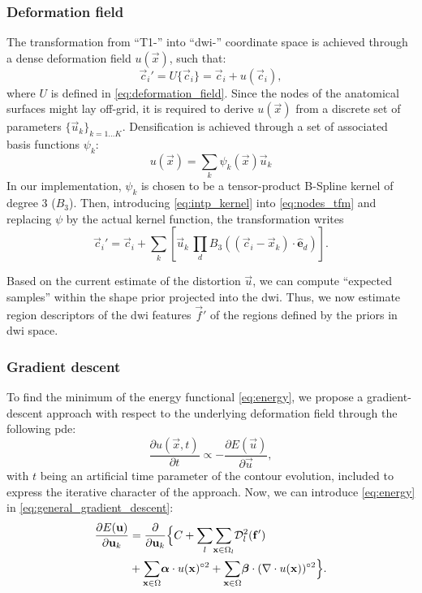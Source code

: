 \subsubsection{Deformation field}
\label{sec:deformation_field}
The transformation from ``T1-'' into ``\gls{dwi}-'' coordinate space is 
achieved through a dense deformation field $u(\vec{x})$, such that:
\begin{equation}
\vec{c}_i' = U\{\vec{c}_i\} = \vec{c}_i + u(\vec{c}_i),
\label{eq:nodes_tfm}
\end{equation}
where $U$ is defined in \eqref{eq:deformation_field}. Since the nodes of the anatomical 
surfaces might lay off-grid, it is required to derive $u(\vec{x})$ from a discrete 
set of parameters $\{\vec{u}_k\}_{k=1 \ldots K}$. Densification is achieved through 
a set of associated basis functions $\psi_k$:
%
\begin{equation}
u(\vec{x}) = \sum_k \psi_k(\vec{x}) \vec{u}_k
\label{eq:intp_kernel}
\end{equation}
%
In our implementation, $\psi_k$ is chosen to be a tensor-product B-Spline kernel
of degree 3 ($B_3$).
Then, introducing \eqref{eq:intp_kernel} into \eqref{eq:nodes_tfm} and replacing
$\psi$ by the actual kernel function, the transformation writes
%
\begin{equation}
\vec{c}_i' = \vec{c}_i + \sum_k \left[ \vec{u}_k \, \underset{d}{\prod} B_3( (\vec{c}_i - \vec{x}_k) \cdot \hat{\mathbf{e}}_d ) \right].
\label{eq:transformation}
\end{equation} 

Based on the current estimate of the distortion $\vec{u}$, we can compute 
``expected samples'' within the shape prior projected into the \gls{dwi}.
Thus, we now estimate region descriptors of the \gls{dwi} features 
$\vec{f}'$ of the regions defined by the priors in \gls{dwi} space.

\subsubsection{Gradient descent}
To find the minimum of the energy functional \eqref{eq:energy},
we propose a gradient-descent approach with respect to the underlying 
deformation field through the following \gls*{pde}:
\begin{equation}
\frac{\partial u(\vec{x},t)}{\partial t} \propto - \frac{\partial E(\vec{u})}{\partial \vec{u}},
\label{eq:general_gradient_descent}
\end{equation}
with $t$ being an artificial time parameter of the contour
evolution, included to express the iterative character of the approach.
Now, we can introduce \eqref{eq:energy} in
\eqref{eq:general_gradient_descent}:
\begin{align}
\frac{\partial E(\vec{u})}{\partial \vec{u}_k} &=
\frac{ \partial }{\partial \vec{u}_k} \Big\{
C + \underset{l}{\sum}
\underset{\vec{x} \in \Omega_l}{\sum} \mdist{f'}{l} \notag\\
&+ \underset{\vec{x} \in \Omega}{\sum} \boldsymbol{\alpha} \cdot u(\vec{x})^{\circ2}
+ \underset{\vec{x} \in \Omega}{\sum} \boldsymbol{\beta} \cdot (\nabla \cdot u(\vec{x}))^{\circ2}
\Big\}.
\label{eq:gradient_descent}
\end{align}

